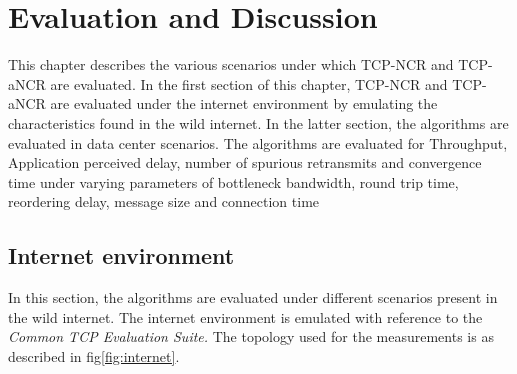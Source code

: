 \chapter{Evaluation and Discussion\label{cha:chapter7}}
This chapter describes the various scenarios under which TCP-NCR and TCP-aNCR are evaluated. In the first section of this chapter, TCP-NCR and TCP-aNCR are evaluated under the internet environment by emulating the characteristics found in the wild internet. In the latter section, the algorithms are evaluated in data center scenarios.
The algorithms are evaluated for Throughput, Application perceived delay, number of spurious retransmits and convergence time under varying parameters of bottleneck bandwidth, round trip time, reordering delay, message size and connection time

\section{Internet environment\label{sec:InternetScenario}}
In this section, the algorithms are evaluated under different scenarios present in the wild internet. The internet environment is emulated with reference to the \textit{Common TCP Evaluation Suite.}\cite{tcpevalsuite} The topology used for the measurements is as described in fig\ref{fig:internet}.

